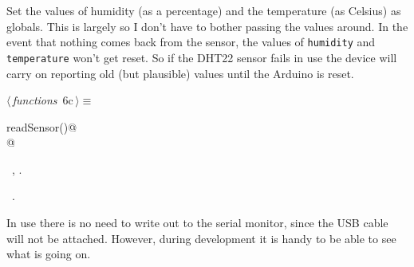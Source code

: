 \documentclass[a4paper, 11pt]{article}
\begin{document}
Set the values of humidity (as a percentage)
and the temperature (as Celsius) as globals.
This is largely so I don't have to bother passing the values around.
In the event that nothing comes back from the sensor,
the values of \verb|humidity| and \verb|temperature|
won't get reset.
So if the DHT22 sensor fails in use
the device will carry on reporting old
(but plausible) values
until the Arduino is reset.

\begin{flushleft} \small
\begin{minipage}{\linewidth}\label{scrap5}\raggedright\small
{}$\langle\,${\itshape functions}\nobreak\ {\footnotesize{6c}}$\,\rangle\equiv$
\vspace{-1ex}
\begin{list}{}{\setlength{\leftmargin}{1em}} \item
\mbox{}\lstinline@void readSensor()@\\
\mbox{}@\\
\mbox{}{\NWsep}
\end{list}
\vspace{-1ex}
\vspace{-1ex}
\footnotesize
\begin{list}{}{\setlength{\itemsep}{-\parsep}\setlength{\itemindent}{-\leftmargin}}
\item \NWtxtMacroDefBy\ , .
\item \NWtxtMacroRefIn\ .
\end{list}
\end{minipage}
\end{flushleft}

In use there is no need to write out to the serial monitor,
since the USB cable will not be attached.
However, during development it is handy to be able to see what is going on.
\end{document}
